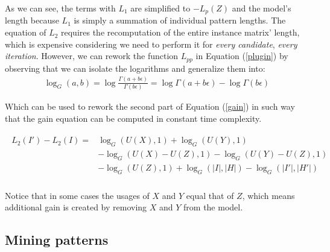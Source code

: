\documentclass{llncs}
\begin{document}
As we can see, the terms with $L_1$ are simplified to $- L_p(Z)$ and the model's length because $L_1$ is simply a summation of individual pattern lengths. The equation of $L_2$ requires the recomputation of the entire instance matrix' length, which is expensive considering we need to perform it for \emph{every candidate}, \emph{every iteration}. However, we can rework the function $L_{pp}$ in Equation (\ref{plugin}) by observing that we can isolate the logarithms and generalize them into:
\begin{align}
	\log_G(a,b) = \log \frac{\Gamma(a+ b\epsilon)}{\Gamma(b\epsilon)} = \log \Gamma(a+ b\epsilon) - \log \Gamma(b\epsilon)
\end{align} 

\noindent Which can be used to rework the second part of Equation (\ref{gain}) in such way that the gain equation can be computed in constant time complexity.

\begin{align}
\begin{split}
	L_2(I') - L_2(I) = &\log_G(U(X),1) + \log_G(U(Y),1) \\
			      &- \log_G(U(X)-U(Z),1) - \log_G(U(Y)-U(Z),1) \\
			      &- \log_G(U(Z),1) + \log_G(|I|,|H|) - \log_G(|I'|,|H'|) \\
\end{split}   
\end{align}

\noindent Notice that in some cases the usages of $X$ and $Y$ equal that of $Z$, which means additional gain is created by removing $X$ and $Y$ from the model. 

\subsection{Mining patterns}
\end{document}
